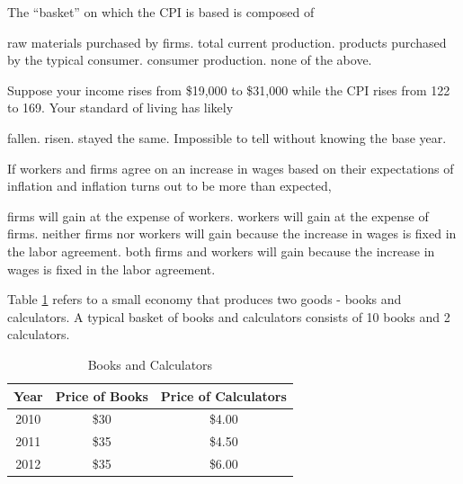 \documentclass[addpoints,11pt]{exam}
\theoremstyle{definition}
\begin{document}
\begin{questions}
\newpage

\question The ``basket'' on which the CPI is based is composed of 

\begin{choices}
	\choice raw materials purchased by firms.
	\choice total current production.
	\CorrectChoice products purchased by the typical consumer.
	\choice consumer production.
	\choice none of the above.
\end{choices}


\question Suppose your income rises from \$19,000 to \$31,000 while the CPI rises from 122 to 169. Your standard of living has likely

\begin{choices}
	\choice fallen.
	\CorrectChoice risen.
	\choice stayed the same.
	\choice Impossible to tell without knowing the base year.
\end{choices}

\question If workers and firms agree on an increase in wages based on their expectations of inflation and inflation turns out to be more than expected,

\begin{choices}
	\CorrectChoice firms will gain at the expense of workers.
	\choice workers will gain at the expense of firms.
	\choice neither firms nor workers will gain because the increase in wages is fixed in the labor agreement.
	\choice both firms and workers will gain because the increase in wages is fixed in the labor agreement.
\end{choices}
			
		\question Table \ref{tab2} refers to a small economy that produces two goods - books and calculators. A typical basket of books and calculators consists of 10 books and 2 calculators.
		
		\begin{table}[H]
			\caption{Books and Calculators}
			\label{tab2}
			\centering
			\begin{tabular}{  c|c|c}        
				
				Year   & Price of Books & Price of Calculators \\
				\hline
				2010 &  \$30 & \$4.00\\
				2011 & \$35 & \$4.50\\
				2012 & \$35 & \$6.00 \\
			\end{tabular}
		\end{table}
\end{questions}
\end{document}
